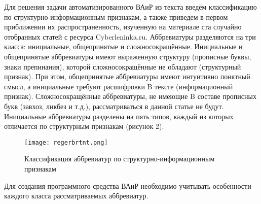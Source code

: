 \documentclass{article}
\begin{document}
Для решения задачи автоматизированного ВАиР из текста введём классификацию по структурно-информационным признакам, а также приведем в первом приближении их распространенность, изученную на материале ста случайно отобранных статей с ресурса Cyberleninka.ru. Аббревиатуры разделяются на три класса: инициальные, общепринятые и сложносокращённые. Инициальные и общепринятые аббревиатуры имеют выраженную структуру (прописные буквы, знаки препинания), которой сложносокращённые не обладают (структурный признак). При этом, общепринятые аббревиатуры имеют интуитивно понятный смысл, а инициальные требуют расшифровки B тексте (информационный признак). Сложносокращённые аббревиатуры, не имеющие B составе прописных букв (завхоз, ликбез и т.д.), рассматриваться в данной статье не будут. Инициальные аббревиатуры разделены на пять типов, каждый из которых отличается по структурным признакам (рисунок 2).\newpage
\begin{figure}[H]
    \centering
    \texttt{[image: regerbrtnt.png]}
    \caption{Классификация аббревиатур по структурно-информационным признакам}
    \label{fig:enter-label}
\end{figure}
Для создания программного средства ВАиР необходимо учитывать особенности каждого класса рассматриваемых аббревиатур.
\end{document}
